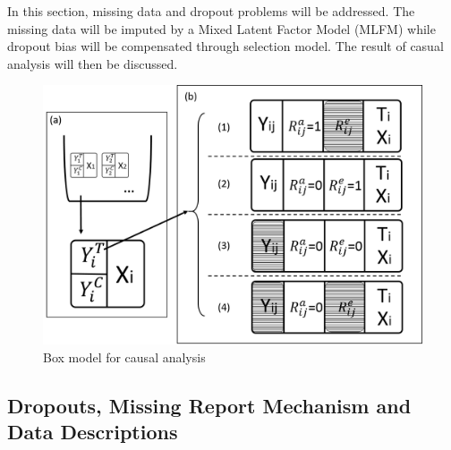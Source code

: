 \documentclass[preprint,12pt]{elsarticle}
\begin{document}
In this section, missing data and dropout problems will be addressed. The missing data will be imputed by a Mixed Latent Factor Model (MLFM) while dropout bias will be compensated through selection model. The result of casual analysis will then be discussed.    

\begin{figure}[!htb]
\centering
\includegraphics[scale=0.4]{box_model.png}
\caption{Box model for causal analysis}
\label{fig:box_model}
\end{figure}

\subsection{Dropouts, Missing Report Mechanism and Data Descriptions}
\end{document}
